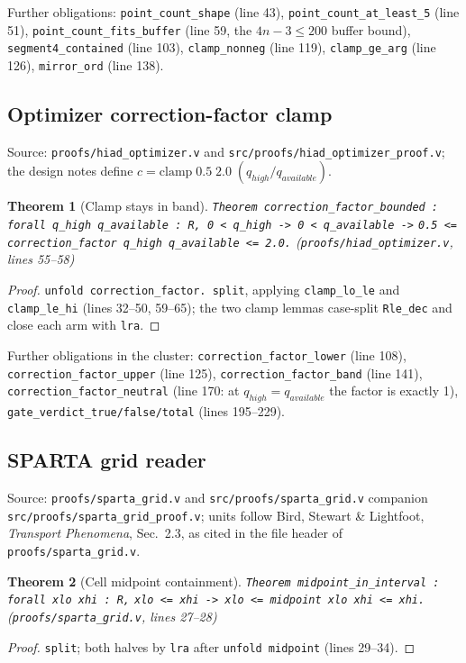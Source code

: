 \documentclass[11pt]{article}
\newtheorem{theorem}{Theorem}
\theoremstyle{definition}
\begin{document}
Further obligations: \texttt{point\_count\_shape} (line 43),
\texttt{point\_count\_at\_least\_5} (line 51),
\texttt{point\_count\_fits\_buffer} (line 59, the
$4n - 3 \le 200$ buffer bound), \texttt{segment4\_contained} (line 103),
\texttt{clamp\_nonneg} (line 119), \texttt{clamp\_ge\_arg} (line 126),
\texttt{mirror\_ord} (line 138).

\subsection{Optimizer correction-factor clamp}\label{sec:clamp}

Source: \texttt{proofs/hiad\_optimizer.v} and
\texttt{src/proofs/hiad\_optimizer\_proof.v}; the design notes define
$c = \mathrm{clamp}\;0.5\;2.0\;(q_{high}/q_{available})$.

\begin{theorem}[Clamp stays in band]\label{thm:clamp}
\texttt{Theorem correction\_factor\_bounded :}
\texttt{forall q\_high q\_available : R, 0 < q\_high -> 0 < q\_available ->}
\texttt{0.5 <= correction\_factor q\_high q\_available <= 2.0.}
(\texttt{proofs/hiad\_optimizer.v}, lines 55--58)
\end{theorem}
\begin{proof}
\verb|unfold correction_factor. split|, applying
\verb|clamp_lo_le| and \verb|clamp_le_hi| (lines 32--50, 59--65); the two
clamp lemmas case-split \texttt{Rle\_dec} and close each arm with
\texttt{lra}.
\end{proof}

Further obligations in the cluster:
\texttt{correction\_factor\_lower} (line 108),
\texttt{correction\_factor\_upper} (line 125),
\texttt{correction\_factor\_band} (line 141),
\texttt{correction\_factor\_neutral} (line 170: at $q_{high} = q_{available}$
the factor is exactly 1),
\texttt{gate\_verdict\_true/false/total} (lines 195--229).

\subsection{SPARTA grid reader}\label{sec:sparta}

Source: \texttt{proofs/sparta\_grid.v} and
\texttt{src/proofs/sparta\_grid.v} companion
\texttt{src/proofs/sparta\_grid\_proof.v}; units follow Bird, Stewart \&
Lightfoot, \emph{Transport Phenomena}, Sec.~2.3, as cited in the file
header of \texttt{proofs/sparta\_grid.v}.

\begin{theorem}[Cell midpoint containment]\label{thm:midpoint}
\texttt{Theorem midpoint\_in\_interval : forall xlo xhi : R,}
\texttt{xlo <= xhi -> xlo <= midpoint xlo xhi <= xhi.}
(\texttt{proofs/sparta\_grid.v}, lines 27--28)
\end{theorem}
\begin{proof}
\texttt{split}; both halves by \texttt{lra} after
\texttt{unfold midpoint} (lines 29--34).
\end{proof}
\end{document}
